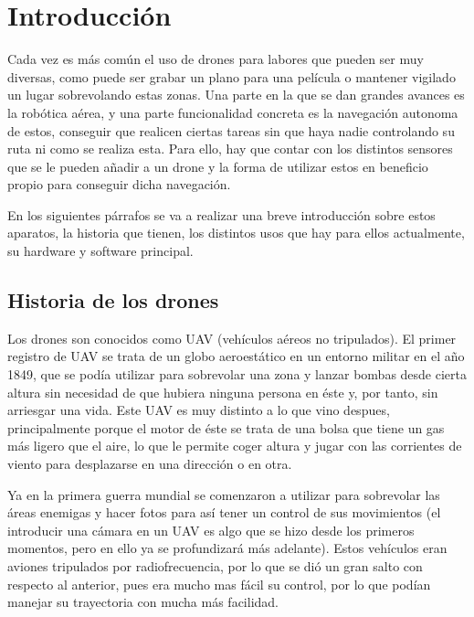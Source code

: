 \chapter{Introducci\'on}\label{cap.introduccion}
\hspace{1 cm}Cada vez es m\'as com\'un el uso de drones para labores que pueden ser muy diversas, como puede ser grabar un plano para una pel\'icula o mantener vigilado un lugar sobrevolando estas zonas. Una parte en la que se dan grandes avances es la rob\'otica a\'erea, y una parte funcionalidad concreta es la navegaci\'on autonoma de estos, conseguir que realicen ciertas tareas sin que haya nadie controlando su ruta ni como se realiza esta. Para ello, hay que contar con los distintos sensores que se le pueden añadir a un drone y la forma de utilizar estos en beneficio propio para conseguir dicha navegaci\'on.

\hspace{1cm} En los siguientes p\'arrafos se va a realizar una breve introducci\'on sobre estos aparatos, la historia que tienen, los distintos usos que hay para ellos actualmente, su hardware y software principal.

\section{Historia de los drones}

\hspace{1cm} Los drones son conocidos como UAV (veh\'iculos a\'ereos no tripulados). El primer registro de UAV se trata de un globo aeroest\'atico en un entorno militar en el año 1849, que se pod\'ia utilizar para sobrevolar una zona y lanzar bombas desde cierta altura sin necesidad de que hubiera ninguna persona en \'este y, por tanto, sin arriesgar una vida. Este UAV es muy distinto a lo que vino despues, principalmente porque el motor de \'este se trata de una bolsa que tiene un gas m\'as ligero que el aire, lo que le permite coger altura y jugar con las corrientes de viento para desplazarse en una direcci\'on o en otra.

\hspace{1 cm} Ya en la primera guerra mundial se comenzaron a utilizar para sobrevolar las \'areas enemigas y hacer fotos para as\'i tener un control de sus movimientos (el introducir una c\'amara en un UAV es algo que se hizo desde los primeros momentos, pero en ello ya se profundizar\'a m\'as adelante). Estos veh\'iculos eran aviones tripulados por radiofrecuencia, por lo que se di\'o un gran salto con respecto al anterior, pues era mucho mas f\'acil su control, por lo que pod\'ian manejar su trayectoria con mucha m\'as facilidad. 

